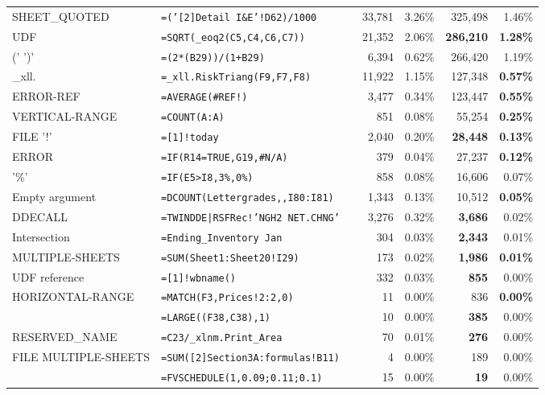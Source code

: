 \begin{tabular}{llrrrrr}
			SHEET_QUOTED & \texttt{=('[2]Detail I\&E'!D62)/1000} &  & 33,781 & 3.26\% & 325,498 & 1.46\%\\
			UDF & \texttt{=SQRT(_eoq2(C5,C4,C6,C7))} &  & 21,352 & 2.06\% & \textbf{286,210} & \textbf{1.28\%}\\
			(' \synt{Reference} ')' & \texttt{=(2*(B29))/(1+B29)} &  & 6,394 & 0.62\% & 266,420 & 1.19\%\\
			_xll. & \texttt{=_xll.RiskTriang(F9,F7,F8)} &  & 11,922 & 1.15\% & 127,348 & \textbf{0.57\%}\\
			ERROR-REF & \texttt{=AVERAGE(\#REF!)} &  & 3,477 & 0.34\% & 123,447 & \textbf{0.55\%}\\
			VERTICAL-RANGE & \texttt{=COUNT(A:A)} &  & 851 & 0.08\% & 55,254 & \textbf{0.25\%}\\
			FILE '!' & \texttt{=[1]!today} &  & 2,040 & 0.20\% & \textbf{28,448} & \textbf{0.13\%}\\
			ERROR & \texttt{=IF(R14=TRUE,G19,\#N/A)} &  & 379 & 0.04\% & 27,237 & \textbf{0.12\%}\\
			'\%' & \texttt{=IF(E5>I8,3\%,0\%)} &  & 858 & 0.08\% & 16,606 & 0.07\%\\
				Empty argument & \texttt{=DCOUNT(Lettergrades,,I80:I81)} &  & 1,343 & 0.13\% & 10,512 & \textbf{0.05\%}\\
				DDECALL & \texttt{=TWINDDE|RSFRec!'NGH2 NET.CHNG'} &  & 3,276 & 0.32\% & \textbf{3,686} & 0.02\%\\
				Intersection & \texttt{=Ending_Inventory Jan} &  & 304 & 0.03\% & \textbf{2,343} & 0.01\%\\
				MULTIPLE-SHEETS & \texttt{=SUM(Sheet1:Sheet20!I29)} &  & 173 & 0.02\% & \textbf{1,986} & \textbf{0.01\%}\\
				UDF reference & \texttt{=[1]!wbname()} &  & 332 & 0.03\% & \textbf{855} & 0.00\%\\
				HORIZONTAL-RANGE & \texttt{=MATCH(F3,Prices!2:2,0)} &  & 11 & 0.00\% & 836 & \textbf{0.00\%}\\
				\synt{Union} & \texttt{=LARGE((F38,C38),1)} &  & 10 & 0.00\% & \textbf{385} & 0.00\%\\
				RESERVED_NAME & \texttt{=C23/_xlnm.Print_Area} &  & 70 & 0.01\% & \textbf{276} & 0.00\%\\
				FILE MULTIPLE-SHEETS & \texttt{=SUM([2]Section3A:formulas!B11)} &  & 4 & 0.00\% & 189 & 0.00\%\\
				\synt{ConstantArray} & \texttt{=FVSCHEDULE(1,{0.09;0.11;0.1})} &  & 15 & 0.00\% & \textbf{19} & 0.00\%\\
			\hline
	\end{tabular}
